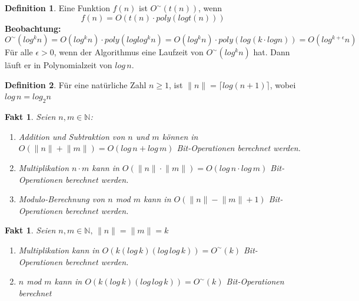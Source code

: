 \documentclass[12pt,oneside]{article}
\newtheorem{fact}[theorem]{Fakt}
\theoremstyle{remark}
\theoremstyle{definition}
\newtheorem{definition}{Definition}[section]
\begin{document}
\begin{definition}
Eine Funktion $f(n)$ ist $ O^{\sim}(t(n))$, wenn
\begin{equation}
    f(n) = O(t(n) \cdot poly(log t(n)))
\end{equation}
\textbf{Beobachtung:}
\begin{equation}
    O^{\sim}(log^k n) = O(log^k n) \cdot poly(log log^k n) = O(log^k n) \cdot poly(log( k \cdot log n)) = O(log^{k+\epsilon}n)
\end{equation}
Für alle $\epsilon > 0$, wenn der Algorithmus eine Laufzeit von $O^{\sim}(log^k n)$ hat. Dann läuft er in Polynomialzeit von $log \, n$.
\end{definition}

\begin{definition}
Für eine natürliche Zahl $n \geq 1$, ist $\lVert n \rVert= \lceil log(n + 1) \rceil$, wobei $log \, n = log_{2} n$
\end{definition}
\begin{fact}\label{fact_1}
Seien $n,m \in \mathbb{N}$:\newline
\begin{enumerate}
    \item Addition und Subtraktion von $n$ und $m$ können in $O(\lVert n \rVert + \lVert m \rVert) = O(log \, n + log \, m)$ Bit-Operationen berechnet werden.\newline
    \item Multiplikation $ n \cdot m$ kann in $O(\lVert n \rVert \cdot \lVert m \rVert) = O(log \, n \cdot log \, m)$ Bit-Operationen berechnet werden.\newline
    \item Modulo-Berechnung von $n$ mod $m$ kann in $O(\lVert n \rVert - \lVert m \rVert + 1)$ Bit-Operationen berechnet werden.\newline\newline
\end{enumerate}
\end{fact}

\begin{fact}\label{fact_2}
Seien $n,m \in \mathbb{N}, \, \lVert n \rVert = \lVert m \rVert =k$
\begin{enumerate}
    \item Multiplikation kann in $O(k (log \, k)(log \, log \, k)) = O^{\sim}(k)$ Bit-Operationen berechnet werden.\newline
    \item $n$ mod $m$ kann in $O(k (log \, k)(log \, log \, k)) = O^{\sim}(k)$ Bit-Operationen berechnet
\end{enumerate}
\end{fact}
\end{document}
